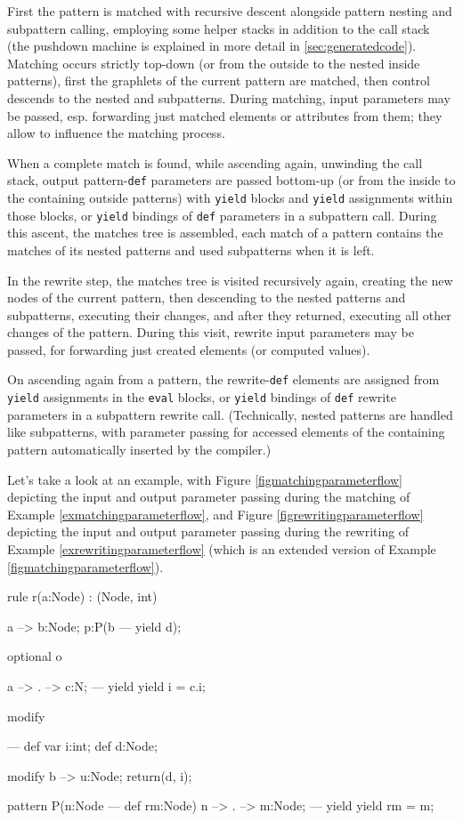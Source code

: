 First the pattern is matched with recursive descent alongside pattern nesting and subpattern calling, employing some helper stacks in addition to the call stack (the pushdown machine is explained in more detail in \ref{sec:generatedcode}).
Matching occurs strictly top-down (or from the outside to the nested inside patterns), first the graphlets of the current pattern are matched, then control descends to the nested and subpatterns.
During matching, input parameters may be passed, esp. forwarding just matched elements or attributes from them; they allow to influence the matching process.

When a complete match is found, while ascending again, unwinding the call stack, output pattern-\texttt{def} parameters are passed bottom-up (or from the inside to the containing outside patterns) with \texttt{yield} blocks and \texttt{yield} assignments within those blocks, or \texttt{yield} bindings of \texttt{def} parameters in a subpattern call.
During this ascent, the matches tree is assembled, each match of a pattern contains the matches of its nested patterns and used subpatterns when it is left.

In the rewrite step, the matches tree is visited recursively again, creating the new nodes of the current pattern, then descending to the nested patterns and subpatterns, executing their changes, and after they returned, executing all other changes of the pattern.
During this visit, rewrite input parameters may be passed, for forwarding just created elements (or computed values). 

On ascending again from a pattern, the rewrite-\texttt{def} elements are assigned from \texttt{yield} assignments in the \texttt{eval} blocks, or \texttt{yield} bindings of \texttt{def} rewrite parameters in a subpattern rewrite call.
(Technically, nested patterns are handled like subpatterns, with parameter passing for accessed elements of the containing pattern automatically inserted by the compiler.)

Let's take a look at an example, with Figure \ref{figmatchingparameterflow} depicting the input and output parameter passing during the matching of Example \ref{exmatchingparameterflow}, and Figure \ref{figrewritingparameterflow} depicting the input and output parameter passing during the rewriting of Example \ref{exrewritingparameterflow} (which is an extended version of Example \ref{figmatchingparameterflow}).

\begin{example}
  \begin{grgen}
rule r(a:Node) : (Node, int)
{
  a --> b:Node;
  p:P(b --- yield d);

  optional o {
    a --> . --> c:N;
  ---
    yield { yield i = c.i; }
		
    modify {
    }
  }
---	
  def var i:int;
  def d:Node;
	
  modify {
    b --> u:Node;
    return(d, i);
  }
}

pattern P(n:Node --- def rm:Node)
{
  n --> . --> m:Node;
---
  yield { yield rm = m; }
}
  \end{grgen}
\end{example}\label{exmatchingparameterflow}

